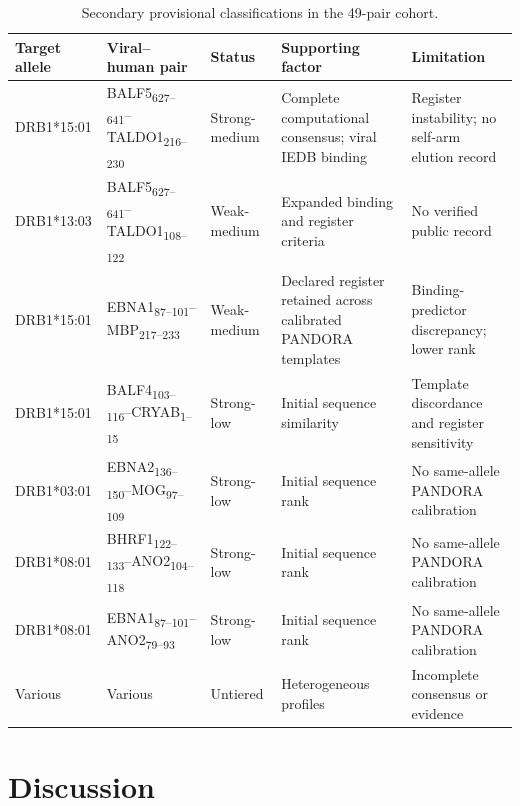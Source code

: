 \documentclass[11pt]{article}
\newcommand{\pep}[2]{#1\textsubscript{#2}}
\begin{document}
\begin{table}[H]\centering\scriptsize
\caption{Secondary provisional classifications in the 49-pair cohort.}
\setlength{\tabcolsep}{2pt}\renewcommand{\arraystretch}{1.2}
\begin{tabular}{p{}p{}p{}p{}p{}}
\toprule Target allele & Viral--human pair & Status & Supporting factor & Limitation \\\midrule
DRB1*15:01 & \pep{BALF5}{627--641}--\pep{TALDO1}{216--230} & Strong-medium & Complete computational consensus; viral IEDB binding & Register instability; no self-arm elution record\\
DRB1*13:03 & \pep{BALF5}{627--641}--\pep{TALDO1}{108--122} & Weak-medium & Expanded binding and register criteria & No verified public record\\
DRB1*15:01 & \pep{EBNA1}{87--101}--\pep{MBP}{217--233} & Weak-medium & Declared register retained across calibrated PANDORA templates & Binding-predictor discrepancy; lower rank\\
DRB1*15:01 & \pep{BALF4}{103--116}--\pep{CRYAB}{1--15} & Strong-low & Initial sequence similarity & Template discordance and register sensitivity\\
DRB1*03:01 & \pep{EBNA2}{136--150}--\pep{MOG}{97--109} & Strong-low & Initial sequence rank & No same-allele PANDORA calibration\\
DRB1*08:01 & \pep{BHRF1}{122--133}--\pep{ANO2}{104--118} & Strong-low & Initial sequence rank & No same-allele PANDORA calibration\\
DRB1*08:01 & \pep{EBNA1}{87--101}--\pep{ANO2}{79--93} & Strong-low & Initial sequence rank & No same-allele PANDORA calibration\\
Various & Various & Untiered & Heterogeneous profiles & Incomplete consensus or evidence\\\bottomrule
\end{tabular}\end{table}

\section{Discussion}
\end{document}
